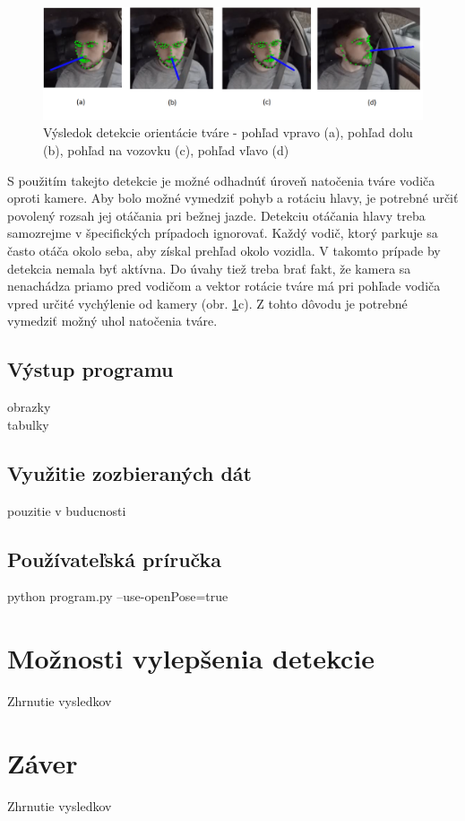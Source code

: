 \documentclass[slovak,master,dept460,male,cpp,cpdeclaration]{diploma}
\begin{document}
\begin{figure}[H]
	\centering
	\includegraphics[width=1\textwidth]{Figures/faceRotation.png}
	\caption{Výsledok detekcie orientácie tváre - pohľad vpravo (a), pohľad dolu (b), pohľad na vozovku (c), pohľad vľavo (d)}
	\label{fig:faceRotation}
\end{figure}

S použitím takejto detekcie je možné odhadnúť úroveň natočenia tváre vodiča oproti kamere. Aby bolo možné vymedziť pohyb a rotáciu hlavy, je potrebné určiť povolený rozsah jej otáčania pri bežnej jazde. Detekciu otáčania hlavy treba  samozrejme v špecifických prípadoch ignorovať. Každý vodič, ktorý parkuje sa často otáča okolo seba, aby získal prehľad okolo vozidla. V takomto prípade  by detekcia  nemala byť aktívna. Do úvahy tiež treba brať fakt, že kamera sa nenachádza priamo pred vodičom a vektor rotácie tváre má  pri pohľade vodiča vpred určité vychýlenie od kamery (obr. \ref{fig:faceRotation}c). Z tohto dôvodu je potrebné  vymedziť  možný uhol natočenia tváre. 




\newpage
\subsection{Výstup programu}
obrazky\\
tabulky


\newpage
\subsection{Využitie zozbieraných dát}
pouzitie v buducnosti


\newpage
\subsection{Používateľská príručka}
python program.py --use-openPose=true


\newpage
\section{Možnosti vylepšenia detekcie}
\label{sec:Možnosti vylepšenia detekcie}
Zhrnutie vysledkov


\newpage
\section{Záver}
\label{sec:Zaver}
Zhrnutie vysledkov








\end{document}
